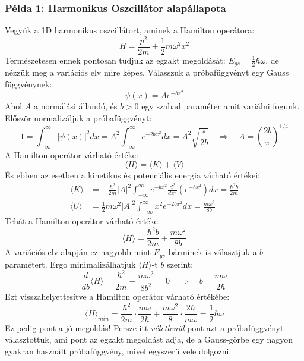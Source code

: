 \documentclass[../main.tex]{subfiles}
\begin{document}
\subsubsection*{Példa 1: Harmonikus Oszcillátor alapállapota}
Vegyük a 1D harmonikus oszcillátort, aminek a Hamilton operátora:
\begin{equation}
    H = \frac{p^2}{2m} + \frac{1}{2} m \omega^2 x^2
\end{equation}
Természetesen ennek pontosan tudjuk az egzakt megoldását: $E_{gs} = \frac{1}{2} \hbar \omega$, de nézzük meg a variációs elv  mire képes. Válasszuk a próbafüggvényt egy Gauss függvénynek:
\begin{equation}
    \psi(x) = A e^{-b x^2}
\end{equation}
Ahol $A$ a normálási állandó, és $b > 0$ egy szabad paraméter amit variálni fogunk. Először normalizáljuk a próbafüggvényt:
\begin{equation}
    1 = \int_{-\infty}^{\infty} |\psi(x)|^2 dx = A^2 \int_{-\infty}^{\infty} e^{-2 b x^2} dx = A^2 \sqrt{\frac{\pi}{2b}} \quad \Rightarrow \quad A = \left( \frac{2b}{\pi} \right)^{1/4}
\end{equation}
A Hamilton operátor várható értéke:
\begin{equation}
    \langle H \rangle = \langle K \rangle + \langle V \rangle
\end{equation}
És ebben az esetben a kinetikus és potenciális energia várható értékei:
\begin{equation}
    \begin{aligned}
        \langle K \rangle &= - \frac{\hbar^2}{2m} |A|^2 \int_{-\infty}^{\infty} e^{-b x^2} \frac{d^2}{dx^2} \left(e^{-b x^2}\right) dx = \frac{\hbar^2 b}{2m} \\
        \langle U \rangle &= \frac{1}{2} m \omega^2 |A|^2 \int_{-\infty}^{\infty} x^2 e^{-2 b x^2} dx = \frac{m \omega^2}{8 b}
    \end{aligned}
\end{equation}
Tehát a Hamilton operátor várható értéke:
\begin{equation}
    \langle H \rangle = \frac{\hbar^2 b}{2m} + \frac{m \omega^2}{8 b}
\end{equation}
A variációs elv alapján ez nagyobb mint $E_{gs}$ bárminek is választjuk a $b$ paramétert. Ergo minimalizálhatjuk $\langle H \rangle$-t $b$ szerint:
\begin{equation}
    \frac{d}{d b} \langle H \rangle = \frac{\hbar^2}{2m} - \frac{m \omega^2}{8 b^2} = 0 \quad \Rightarrow \quad b = \frac{m \omega}{2 \hbar}
\end{equation}
Ezt visszahelyettesítve a Hamilton operátor várható értékébe:
\begin{equation}
    \langle H \rangle_{min} = \frac{\hbar^2}{2m} \cdot \frac{m \omega}{2 \hbar} + \frac{m \omega^2}{8} \cdot \frac{2 \hbar}{m \omega} = \frac{1}{2} \hbar \omega
\end{equation}
Ez pedig pont a jó megoldás! Persze itt \textit{véletlenül} pont azt a próbafüggvényt választottuk, ami pont az egzakt megoldást adja, de a Gauss-görbe egy nagyon gyakran használt próbafüggvény,
mivel egyszerű vele dolgozni.
\end{document}
